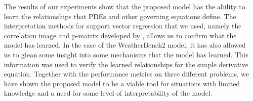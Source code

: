 The results of our experiments show that the proposed model has the ability to learn the relationships that PDEs and other governing equations define. The interpretation methods for support vector regression that we used, namely the correlation image and p-matrix developed by \textcite{ustunVisualisationInterpretationSupport2007}, allows us to confirm what the model has learned. In the case of the WeatherBench2 model, it has also allowed us to glean some insight into some mechanisms that the model has learned. This information was used to verify the learned relationships for the simple derivative equation. Together with the performance metrics on three different problems, we have shown the proposed model to be a viable tool for situations with limited knowledge and a need for some level of interpretability of the model.
